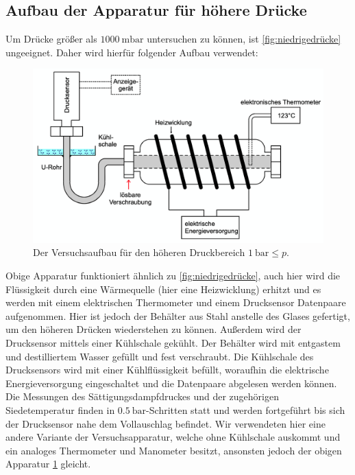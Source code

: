     \subsection{Aufbau der Apparatur für höhere Drücke}
    Um Drücke größer als $\SI{1000}{\milli\bar}$ untersuchen zu können, ist \ref{fig:niedrigedrücke} ungeeignet. Daher wird
    hierfür folgender Aufbau verwendet:
    \begin{figure}
      \centering
      \includegraphics[scale=0.4]{Content/apparaturhohe.png}
      \caption{Der Versuchsaufbau für den höheren Druckbereich $\SI{1}{\bar} \leq p $.}
      \label{fig:hohedrücke}
    \end{figure}
    Obige Apparatur funktioniert ähnlich zu \ref{fig:niedrigedrücke}, auch hier wird die Flüssigkeit durch eine Wärmequelle
    (hier eine Heizwicklung) erhitzt und es werden mit einem elektrischen Thermometer und einem Drucksensor Datenpaare
    aufgenommen. Hier ist jedoch der Behälter aus Stahl anstelle des Glases gefertigt, um den höheren Drücken wiederstehen zu
    können. Außerdem wird der Drucksensor mittels einer Kühlschale gekühlt. Der Behälter wird mit entgastem und destilliertem
    Wasser gefüllt und fest verschraubt. Die Kühlschale des Drucksensors wird mit einer Kühlflüssigkeit befüllt, woraufhin die
    elektrische Energieversorgung eingeschaltet und die Datenpaare abgelesen werden können. Die Messungen des
    Sättigungsdampfdruckes und der zugehörigen Siedetemperatur finden in $\SI{0.5}{\bar}$-Schritten statt und werden fortgeführt
    bis sich der Drucksensor nahe dem Vollauschlag befindet. Wir verwendeten hier eine andere Variante der Versuchsapparatur,
    welche ohne Kühlschale auskommt und ein analoges Thermometer und Manometer besitzt, ansonsten jedoch der obigen Apparatur
    \ref{fig:hohedrücke} gleicht.
\label{sec:Durchführung}
